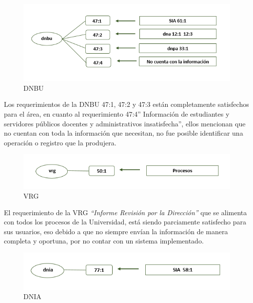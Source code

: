 \documentclass[
]{book}
\begin{document}
\begin{figure}

{\centering \includegraphics[width=0.75\linewidth]{Imagenes/ima11} 

}

\caption{DNBU}\label{fig:unnamed-chunk-39}
\end{figure}

Los requerimientos de la DNBU 47:1, 47:2 y 47:3 están completamente satisfechos para el área, en
cuanto al requerimiento 47:4'' Información de estudiantes y servidores públicos docentes y
administrativos insatisfecha'', ellos mencionan que no cuentan con toda la información que
necesitan, no fue posible identificar una operación o registro que la produjera.

\begin{figure}

{\centering \includegraphics[width=0.75\linewidth]{Imagenes/ima12} 

}

\caption{VRG}\label{fig:unnamed-chunk-40}
\end{figure}

El requerimiento de la VRG \emph{``Informe Revisión por la Dirección''} que se alimenta con todos los
procesos de la Universidad, está siendo parciamente satisfecho para sus usuarios, eso debido a
que no siempre envían la información de manera completa y oportuna, por no contar con un
sistema implementado.

\begin{figure}

{\centering \includegraphics[width=0.75\linewidth]{Imagenes/ima13} 

}

\caption{DNIA}\label{fig:unnamed-chunk-41}
\end{figure}
\end{document}
